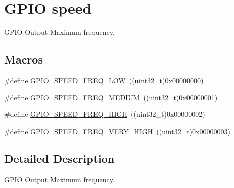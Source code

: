 \hypertarget{group___g_p_i_o__speed}{\section{G\-P\-I\-O speed}
\label{group___g_p_i_o__speed}
}


G\-P\-I\-O Output Maximum frequency.  


\subsection*{Macros}
\begin{DoxyCompactItemize}
\item 
\#define \hyperlink{group___g_p_i_o__speed_gab7916c4265bfa1b26a5205ea9c1caa4e}{G\-P\-I\-O\-\_\-\-S\-P\-E\-E\-D\-\_\-\-F\-R\-E\-Q\-\_\-\-L\-O\-W}~((uint32\-\_\-t)0x00000000)
\item 
\#define \hyperlink{group___g_p_i_o__speed_ga1724a25a9cf00ebf485daeb09cfa1e25}{G\-P\-I\-O\-\_\-\-S\-P\-E\-E\-D\-\_\-\-F\-R\-E\-Q\-\_\-\-M\-E\-D\-I\-U\-M}~((uint32\-\_\-t)0x00000001)
\item 
\#define \hyperlink{group___g_p_i_o__speed_gaef5898db71cdb957cd41f940b0087af8}{G\-P\-I\-O\-\_\-\-S\-P\-E\-E\-D\-\_\-\-F\-R\-E\-Q\-\_\-\-H\-I\-G\-H}~((uint32\-\_\-t)0x00000002)
\item 
\#define \hyperlink{group___g_p_i_o__speed_ga1944cf10e2ab172810d38b681d40b771}{G\-P\-I\-O\-\_\-\-S\-P\-E\-E\-D\-\_\-\-F\-R\-E\-Q\-\_\-\-V\-E\-R\-Y\-\_\-\-H\-I\-G\-H}~((uint32\-\_\-t)0x00000003)
\end{DoxyCompactItemize}


\subsection{Detailed Description}
G\-P\-I\-O Output Maximum frequency. 

